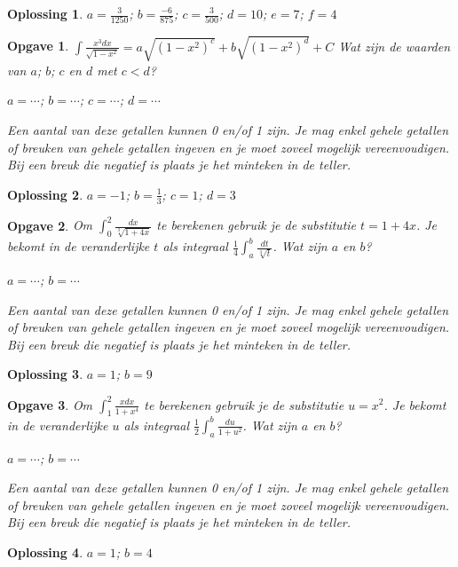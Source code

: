 \documentclass{article}
\newtheorem{opgave}{Opgave}
\newtheorem*{oplossing}{Oplossing}
\begin{document}
\begin{oplossing}
$a=\frac{3}{1250}$; $b=\frac{-6}{875}$; $c=\frac{3}{500}$; $d=10$; $e=7$; $f=4$
\end{oplossing}

\begin{opgave}
$\int \frac{x^3dx}{\sqrt{1-x^2}}=a\sqrt{(1-x^2)^c}+b\sqrt{(1-x^2)^d}+C$ Wat zijn de waarden van $a$; $b$; $c$ en $d$ met $c<d$?\vspace{3mm}

\noindent $a= \cdots$; $b= \cdots$; $c= \cdots$; $d= \cdots$ \vspace{1mm}

\noindent Een aantal van deze getallen kunnen 0 en/of 1 zijn. Je mag enkel gehele getallen of breuken van gehele getallen ingeven en je moet zoveel mogelijk vereenvoudigen. Bij een breuk die negatief is plaats je het minteken in de teller.
\end{opgave}

\begin{oplossing}
$a=-1$; $b=\frac{1}{3}$; $c=1$; $d=3$
\end{oplossing}

\begin{opgave}
Om $\int ^2_0 \frac{dx}{\sqrt[3]{1+4x}}$ te berekenen gebruik je de substitutie $t=1+4x$.
Je bekomt in de veranderlijke $t$ als integraal $\frac{1}{4} \int ^b_a \frac{dt}{\sqrt[3]{t}}$. Wat zijn $a$ en $b$?\vspace{3mm}

\noindent $a= \cdots$; $b=\cdots$\vspace{1mm}

\noindent Een aantal van deze getallen kunnen 0 en/of 1 zijn. Je mag enkel gehele getallen of breuken van gehele getallen ingeven en je moet zoveel mogelijk vereenvoudigen. Bij een breuk die negatief is plaats je het minteken in de teller.
\end{opgave}

\begin{oplossing}
$a=1$; $b=9$
\end{oplossing}

\begin{opgave}
Om $\int ^2_1 \frac{xdx}{1+x^4}$ te berekenen gebruik je de substitutie $u=x^2$.
Je bekomt in de veranderlijke $u$ als integraal $\frac{1}{2} \int ^b_a \frac{du}{1+u^2}$. Wat zijn $a$ en $b$?\vspace{3mm}

\noindent $a= \cdots$; $b=\cdots$\vspace{1mm}

\noindent Een aantal van deze getallen kunnen 0 en/of 1 zijn. Je mag enkel gehele getallen of breuken van gehele getallen ingeven en je moet zoveel mogelijk vereenvoudigen. Bij een breuk die negatief is plaats je het minteken in de teller.
\end{opgave}

\begin{oplossing}
$a=1$; $b=4$
\end{oplossing}
\end{document}
